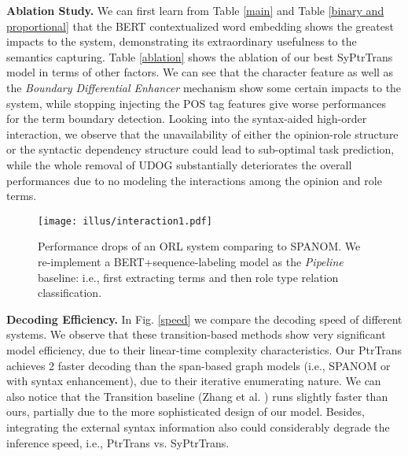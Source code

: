 \documentclass[letterpaper]{article} \usepackage{aaai22}  \usepackage{times}  \usepackage{helvet}  \usepackage{courier}  \usepackage[hyphens]{url}  \usepackage{graphicx} \urlstyle{rm} \def\UrlFont{\rm}  \usepackage{natbib}  \usepackage{caption} \DeclareCaptionStyle{ruled}{labelfont=normalfont,labelsep=colon,strut=off} \frenchspacing  \setlength{\pdfpagewidth}{8.5in}  \setlength{\pdfpageheight}{11in}  \usepackage{algorithm}
\begin{document}
\noindent\textbf{Ablation Study.}
We can first learn from Table \ref{main} and Table \ref{binary and proportional} that the BERT contextualized word embedding shows the greatest impacts to the system, demonstrating its extraordinary usefulness to the semantics capturing.
Table \ref{ablation} shows the ablation of our best SyPtrTrans model in terms of other factors.
We can see that the character feature as well as the \emph{Boundary Differential Enhancer} mechanism show some certain impacts to the system, while stopping injecting the POS tag features give worse performances for the term boundary detection.
Looking into the syntax-aided high-order interaction, we observe that the unavailability of either the opinion-role structure or the syntactic dependency structure could lead to sub-optimal task prediction, while the whole removal of UDOG substantially deteriorates the overall performances due to no modeling the interactions among the opinion and role terms.










\begin{figure}[!t]
\centering
\texttt{[image: illus/interaction1.pdf]}
\caption{
Performance drops of an ORL system comparing to S{\small PAN}OM.
We re-implement a BERT+sequence-labeling model as the \emph{Pipeline} baseline: i.e., first extracting terms and then role type relation classification.
}
\label{interaction}
\end{figure}











\noindent\textbf{Decoding Efficiency.}
In Fig. \ref{speed} we compare the decoding speed of different systems.
We observe that these transition-based methods show very significant model efficiency, due to their linear-time complexity characteristics.
Our PtrTrans achieves 2 faster decoding than the span-based graph models (i.e., S{\small PAN}OM or with syntax enhancement), due to their iterative enumerating nature.
We can also notice that the Transition baseline (Zhang et al. \citeyear{ZhangWF19}) runs slightly faster than ours, partially due to the more sophisticated design of our model.
Besides, integrating the external syntax information also could considerably degrade the inference speed, i.e., PtrTrans vs. SyPtrTrans.
\end{document}
